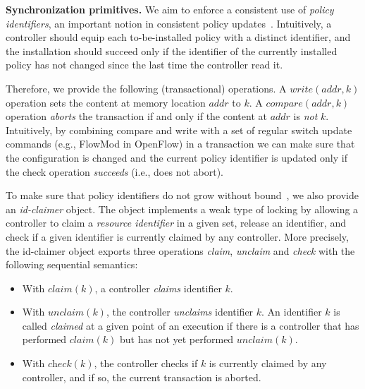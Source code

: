 \documentclass[conference]{sigcomm-alternate}
\newcommand{\Nat}{\mathbb{N}}
\newcommand{\claimcheck}{check\xspace}
\newcommand{\compare}{compare\xspace}
\newcommand{\addr}{\textit{addr}\xspace}
\begin{document}
\vspace{1mm}
\noindent\textbf{Synchronization primitives.}
%
We aim to enforce a consistent use of  \emph{policy identifiers},
an important notion in consistent policy updates~\cite{network-update,stn}.
Intuitively, a controller should
equip each to-be-installed policy with a distinct
identifier,
and the installation should succeed only if the identifier of the
currently installed policy has not changed since the last time the
controller read it.

Therefore, we provide the following (transactional) operations.
A $\textit{write}(\addr,k)$ operation sets the content at memory location
$\addr$ to $k$.
A $\textit{\compare}(\addr,k)$ operation \emph{aborts} the transaction
if and only if the content at
$\addr$ is \emph{not} $k$.
Intuitively, by combining compare and write with a set of regular
switch update commands (e.g., FlowMod in OpenFlow) 
in a transaction  we can make sure that the
configuration is changed and the current policy identifier is updated
only if the check operation \emph{succeeds} (i.e., does not abort).

To make sure that policy identifiers do not grow without bound~\cite{stn}, we
also provide an \emph{id-claimer} object.
The object implements a weak type
of locking by allowing a controller to claim a \emph{resource identifier} in a
given set, release an identifier,  and check if a given identifier
is currently claimed by any controller.
More precisely, the id-claimer object exports three operations \emph{claim},
\emph{unclaim} and \emph{\claimcheck} with the following sequential
semantics:

\begin{itemize}
\item With $\textit{claim}(k)$,
a controller %
\emph{claims}  identifier $k$.

\item With $\textit{unclaim}(k)$, %
the controller %
  \emph{unclaims} identifier $k$.
An identifier $k$ is called \emph{claimed} at a given point of an
execution if there is a controller that has performed $\textit{claim}(k)$
but has not yet performed  $\textit{unclaim}(k)$.

\item With $\textit{\claimcheck}(k)$, the controller checks if $k$ is
  currently claimed by any controller, and if so, the current transaction is
  aborted.

\end{itemize}
\end{document}

